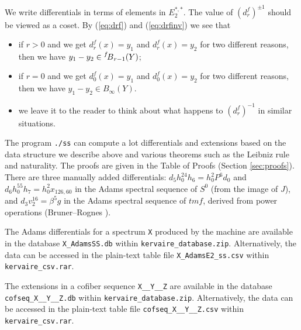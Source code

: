 \documentclass{amsart}
\numberwithin{equation}{section}
\newcommand{\BESS}[1]{\prescript{#1\!}{}{B}}
\begin{document}
We write differentials in terms of elements in $E_2^{*,*}$. The value of $(d_r^f)^{\pm 1}$ should be viewed as a coset. By (\ref{eq:drf}) and (\ref{eq:drfinv}) we see that
\begin{itemize}
    \item if $r>0$ and we get $d_r^f(x)=y_1$ and $d_r^f(x)=y_2$ for two different reasons, then we have $y_1-y_2\in \BESS{f}_{r-1}(Y)$;
    \item if $r=0$ and we get $d_0^f(x)=y_1$ and $d_0^f(x)=y_2$ for two different reasons, then we have $y_1-y_2\in B_\infty(Y)$.
    \item we leave it to the reader to think about what happens to $(d^f_r)^{-1}$ in similar situations.
\end{itemize}

The program \verb|./ss| can compute a lot differentials and extensions based on the data structure we describe above and various theorems such as the Leibniz rule and naturality. The proofs are given in the Table of Proofs (Section \ref{sec:proofs}). There are three manually added differentials: $d_5 h_0^{24}h_6=h_0^2P^6d_0$ and
$d_6 h_0^{55}h_7=h_0^2x_{126,60}$ in the Adams spectral sequence of $S^0$ (from the image of $J$), and $d_3 v_2^{16}=\beta^5g$ in the Adams spectral sequence of $\mathit{tmf}$, derived from power operations (Bruner--Rognes \cite{BR21}).

The Adams differentials for a spectrum \verb|X| produced by the machine are available in the database \verb|X_AdamsSS.db| within \verb|kervaire_database.zip|. Alternatively, the data can be accessed in the plain-text table file \verb|X_AdamsE2_ss.csv| within \verb|kervaire_csv.rar|.


The extensions in a cofiber sequence \verb|X__Y__Z| are available in the database \verb|cofseq_X__Y__Z.db| within \verb|kervaire_database.zip|. Alternatively, the data can be accessed in the plain-text table file \verb|cofseq_X__Y__Z.csv| within \verb|kervaire_csv.rar|.
\end{document}
